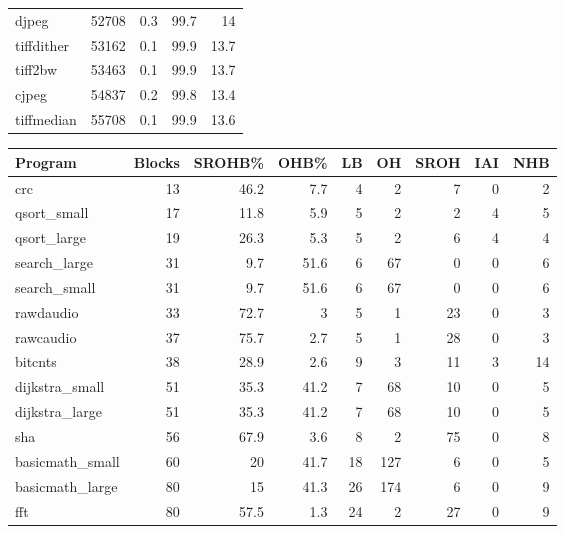 \begin{tabular}{lrrrr}
 djpeg           &   52708 &    0.3 &         99.7 &    14   \\
 tiffdither      &   53162 &    0.1 &         99.9 &    13.7 \\
 tiff2bw         &   53463 &    0.1 &         99.9 &    13.7 \\
 cjpeg           &   54837 &    0.2 &         99.8 &    13.4 \\
 tiffmedian      &   55708 &    0.1 &         99.9 &    13.6 \\
\hline
\end{tabular}\begin{tabular}{lrrrrrrrr}
\hline
 Program         &   Blocks &   SROHB\% &   OHB\% &   LB &   OH &   SROH &   IAI &   NHB \\
\hline
 crc             &       13 &     46.2 &    7.7 &    4 &    2 &      7 &     0 &     2 \\
 qsort\_small     &       17 &     11.8 &    5.9 &    5 &    2 &      2 &     4 &     5 \\
 qsort\_large     &       19 &     26.3 &    5.3 &    5 &    2 &      6 &     4 &     4 \\
 search\_large    &       31 &      9.7 &   51.6 &    6 &   67 &      0 &     0 &     6 \\
 search\_small    &       31 &      9.7 &   51.6 &    6 &   67 &      0 &     0 &     6 \\
 rawdaudio       &       33 &     72.7 &    3   &    5 &    1 &     23 &     0 &     3 \\
 rawcaudio       &       37 &     75.7 &    2.7 &    5 &    1 &     28 &     0 &     3 \\
 bitcnts         &       38 &     28.9 &    2.6 &    9 &    3 &     11 &     3 &    14 \\
 dijkstra\_small  &       51 &     35.3 &   41.2 &    7 &   68 &     10 &     0 &     5 \\
 dijkstra\_large  &       51 &     35.3 &   41.2 &    7 &   68 &     10 &     0 &     5 \\
 sha             &       56 &     67.9 &    3.6 &    8 &    2 &     75 &     0 &     8 \\
 basicmath\_small &       60 &     20   &   41.7 &   18 &  127 &      6 &     0 &     5 \\
 basicmath\_large &       80 &     15   &   41.3 &   26 &  174 &      6 &     0 &     9 \\
 fft             &       80 &     57.5 &    1.3 &   24 &    2 &     27 &     0 &     9 \\

\end{tabular}
